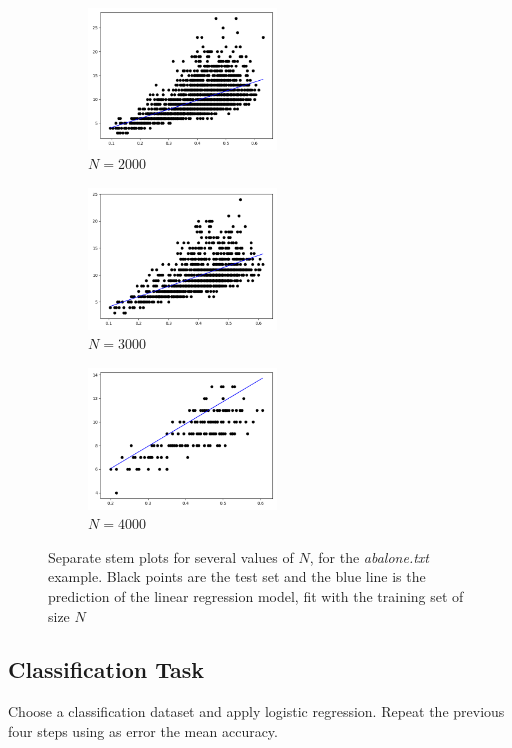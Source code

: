 \documentclass[12pt,letterpaper]{article}
\begin{document}
\begin{enumerate}[leftmargin=!,labelindent=5pt]
\begin{figure}[H]
        \begin{subfigure}{0.3\textwidth}
        \includegraphics[width=5cm]{images/M2000.jpg} 
        \caption{$N = 2000$}
        \label{fig:subim4}
        \end{subfigure}
        \begin{subfigure}{0.3\textwidth}
        \includegraphics[width=5cm]{images/M3000.jpg}
        \caption{$N = 3000$}
        \label{fig:subim5}
        \end{subfigure}
        \begin{subfigure}{0.3\textwidth}
        \includegraphics[width=5cm]{images/M4000.jpg}
        \caption{$N = 4000$}
        \label{fig:subim6}
        \end{subfigure}
        \caption{Separate stem plots for several values of $N$,  for the \textit{abalone.txt} example. Black points are the  test set and the blue line is the prediction of the linear regression model, fit with the training set of  size $N$}
        \end{figure}
\end{enumerate}
\newpage
\subsection*{Classification Task}
Choose a classification dataset and apply logistic regression. Repeat the previous four steps using as error the mean accuracy.
\end{document}
